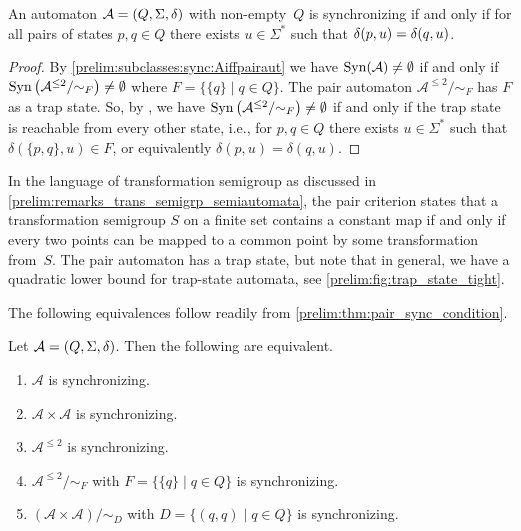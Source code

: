 \begin{theorem}
	\label{prelim:thm:pair_sync_condition}
	An automaton $\mathcal A = (Q, \Sigma, \delta)$  with non-empty~$Q$
	is synchronizing if and only if for all pairs of states $p, q \in Q$
	there exists $u \in \Sigma^*$
	such that $\delta(p,u) = \delta(q,u)$. 
\end{theorem}
\begin{proof}
	By \cref{prelim:subclasses:sync:Aiffpairaut} 
	we have $\operatorname{Syn}(\mathcal A) \ne \emptyset$
	if and only if 
	$\operatorname{Syn}\left(\mathcal A^{\le 2} / {\sim_F}\right) \ne \emptyset$ where $F = \{\{q\} \mid q \in Q\}$.
	The pair automaton $\mathcal A^{\le 2} / {\sim_F}$
	has $F$ as a trap state.
	So, by ,
	we have
	$\operatorname{Syn}\left(\mathcal A^{\le 2} / {\sim_F}\right) \ne \emptyset$
	if and only if the trap state is reachable from every other state, i.e.,
	for $p, q\in Q$ there exists $u \in \Sigma^*$
	such that $\delta(\{p,q\}, u) \in F$, or equivalently
	$\delta(p, u) = \delta(q, u)$.	
\end{proof}

\begin{remark}
	In the language of transformation semigroup as discussed in \cref{prelim:remarks_trans_semigrp_semiautomata}, 
	the pair criterion states that a transformation semigroup $S$ on a finite set
	contains a constant map if and only if every two points can be mapped
	to a common point by some transformation from~$S$.
	The pair automaton has a trap state, but note that in general,
	we have a quadratic lower bound for trap-state automata, see \cref{prelim:fig:trap_state_tight}.	
\end{remark}

The following equivalences follow readily from \cref{prelim:thm:pair_sync_condition}.

\begin{corollary}
 Let $\mathcal A = (Q, \Sigma, \delta)$.
 Then the following are equivalent.
 \begin{enumerate}
 \item $\mathcal A$ is synchronizing.
 
 \item $\mathcal A \times \mathcal A$ is synchronizing.
 
 \item $\mathcal A^{\le 2}$ is synchronizing.
 
 \item $\mathcal A^{\le 2} / {\sim_F}$ with $F = \{\{q\} \mid q \in Q\}$ is synchronizing.
 
 \item $( \mathcal A \times \mathcal A ) / {\sim_D}$ with $D = \{(q,q) \mid q \in Q\}$ is synchronizing.
 \end{enumerate} 	
\end{corollary}


